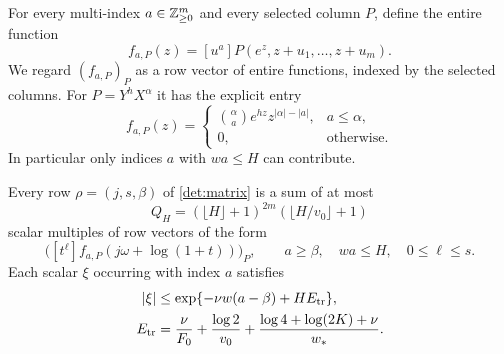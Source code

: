 For every multi-index $a\in\mathbb Z_{\ge0}^m$ and every selected column $P$,
define the entire function
\begin{equation}
 f_{a,P}(z)=[u^a]P(e^z,z+u_1,\ldots,z+u_m).
 \label{det:test-functions}
\end{equation}
We regard $(f_{a,P})_P$ as a row vector of entire functions, indexed by
the selected columns.  For $P=Y^hX^\alpha$ it has the explicit entry
\begin{equation}
 f_{a,P}(z)=
 \begin{cases}
 \displaystyle\binom{\alpha}{a}e^{hz}z^{|\alpha|-|a|},&a\le\alpha,\\
 0,&\text{otherwise}.
 \end{cases}
 \label{det:test-monomials}
\end{equation}
In particular only indices $a$ with $wa\le H$ can contribute.

\begin{lemma}\label{det:translation}
Every row $\rho=(j,s,\beta)$ of \eqref{det:matrix} is a sum of at most
\begin{equation}
 Q_H=(\lfloor H\rfloor+1)^{2m}
          (\lfloor H/v_0\rfloor+1)
 \label{det:term-count}
\end{equation}
scalar multiples of row vectors of the form
\[
 \bigl([t^\ell]f_{a,P}(j\omega+\log(1+t))\bigr)_P,
 \qquad a\ge\beta,\quad wa\le H,\quad0\le\ell\le s.
\]
Each scalar $\xi$ occurring with index $a$ satisfies
\begin{equation}
 \begin{aligned}
 |\xi|&\le\exp\{-\nu w(a-\beta)+H E_{\rm tr}\},\\
 E_{\rm tr}
 &=\frac{\nu}{F_0}+\frac{\log2}{v_0}
   +\frac{\log4+\log(2K)+\nu}{w_*}.
 \end{aligned}
 \label{det:translation-bound}
\end{equation}
\end{lemma}

